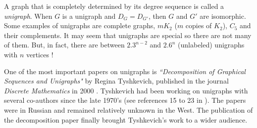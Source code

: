 \documentclass[11pt]{article}
\begin{document}
A graph that is completely determined by its degree sequence is called a {\it unigraph}.   When $G$ is a unigraph and $D_{G} = D_{G'}$, then $G$ and $G'$ are isomorphic.  Some examples of unigraphs are complete graphs, $mK_2$ ($m$ copies of $K_2$), $C_5$ and their complements.  It may seem that unigraphs are special so there are not many of them.  But, in fact, there are between $2.3^{n-2}$ and $2.6^n$ (unlabeled) unigraphs with $n$ vertices \cite{Ty00}!   %
	
	
	



One of the most important papers on unigraphs is {\it ``Decomposition of Graphical Sequences and Unigraphs"} by Regina Tyshkevich, published in the journal {\it Discrete Mathematics} in 2000 \cite{Ty00}.  Tyshkevich had been working on unigraphs with several co-authors since the late 1970's (see references 15 to 23 in \cite{Ty00}).  The papers were in Russian  and remained relatively unknown in the West.  The publication of the decomposition paper finally brought Tyshkevich's work to a wider audience.   
\end{document}

